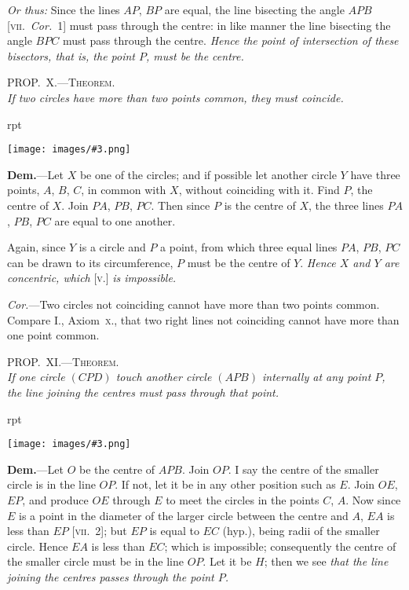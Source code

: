 \documentclass[oneside]{book}
\newcounter{wrapwidth}
\newcommand\myprop[2]{
\bigskip\Needspace*{4\baselineskip}\begin{center}\textsc{#1}\\\medskip\emph{#2}\par\end{center}
}
\newcommand\imgflow[3]{
\setcounter{wrapwidth}{#1}
\begin{wrapfigure}[#2]{r}{\value{wrapwidth}pt}
\begin{center}
\vspace{-0.3in}
\texttt{[image: images/\#3.png]}
\end{center}
\end{wrapfigure}
}
\begin{document}
\begin{footnotesize}
\emph{Or thus:} Since the lines $AP$, $BP$ are equal, the line bisecting
the angle $APB$ [\textsc{vii.}~\emph{Cor.}~1] must pass through the centre: in like
manner the line bisecting the angle $BPC$ must pass through the
centre. \emph{Hence the point of intersection of these bisectors, that is,
the point $P$, must be the centre.}
\par\end{footnotesize}

\myprop{PROP\@.~X.---Theorem.}{If two circles have more than two points common, they
must coincide.}

\imgflow{120}{10}{f113}

\textbf{Dem.}---Let $X$ be one of the circles; and if possible
let another circle $Y$ have three
points, $A$, $B$, $C$, in common with
$X$, without coinciding with it.
Find $P$, the centre of $X$. Join
$PA$, $PB$, $PC$. Then since $P$ is the
centre of $X$, the three lines $PA$,
$PB$, $PC$ are equal to one another.

Again, since $Y$ is a circle and
$P$ a point, from which three equal
lines $PA$, $PB$, $PC$ can be drawn to its circumference,
$P$ must be the centre of $Y$. \emph{Hence $X$ and $Y$ are concentric,
which} [\textsc{v.}] \emph{is impossible.}

\emph{Cor.}---Two circles not coinciding cannot have more
than two points common. Compare I., Axiom~\textsc{x}., that
two right lines not coinciding cannot have more than
one point common.


\myprop{PROP\@.~XI\@.---Theorem.}{If one circle $(CPD)$ touch another circle $(APB)$ internally
at any point $P$, the line joining the centres must pass through that point.}

\imgflow{112}{10}{f114}

\textbf{Dem.}---Let $O$ be the centre of $APB$. Join $OP$. I
say the centre of the smaller
circle is in the line $OP$. If not,
let it be in any other position such
as $E$. Join $OE$, $EP$, and produce
$OE$ through $E$ to meet the circles
in the points $C$, $A$. Now since $E$
is a point in the diameter of the
larger circle between the centre
and $A$, $EA$ is less than $EP$
[\textsc{vii.}~2]; but $EP$ is equal to $EC$
(hyp.), being radii of the smaller circle. Hence $EA$
is less than $EC$; which is impossible; consequently the
centre of the smaller circle must be in the line $OP$.
Let it be $H$; then we see \textit{that the line joining the centres
passes through the point $P$.}
\end{document}
